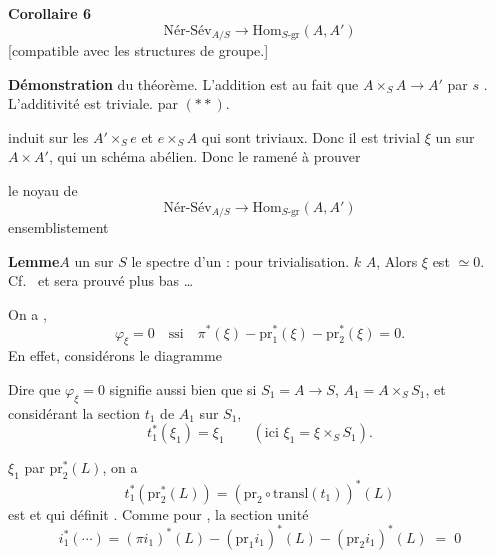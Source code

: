 \documentclass[11pt,a4paper]{article}
\begin{document}
\textbf{Corollaire 6}\quad \ill{}
\[
  \text{Nér-Sév}_{A/S} \longrightarrow
  \mathrm{Hom}_{S\text{-gr}}(A, A')
\]
[compatible avec les structures de groupe.]

\textbf{Démonstration} \ill{} du théorème. L'addition \ill{} est \ill{} au fait
que \ill{} $A \times_{S} A \to A'$ \ill{} par $s$ \ill{}. L'additivité \ill{}
est \ill{} triviale. \ill{} par $(**)$.


\ill{} induit \ill{} sur les \ill{} $A' \times_{S} e$ et $e \times_{S} A$ qui
sont triviaux. Donc il est trivial \ill{} $\xi$ \ill{} un \ill{} sur
$A \times A'$, qui \ill{} un schéma abélien. Donc le \ill{} ramené à prouver
\ill{}


\ill{} le noyau de
\[
  \text{Nér-Sév}_{A/S} \longrightarrow
  \mathrm{Hom}_{S\text{-gr}}(A, A')
\]
\ill{} ensemblistement \ill{}

\textbf{Lemme}\quad $A$ un \ill{} sur \ill{} $S$ \ill{} le spectre d'un \ill{} :
\ill{} pour \ill{} trivialisation. \ill{} $k$  \ill{}
$A$, \ill{} Alors $\xi$ est \ill{} $\simeq 0$. Cf.\ \ill{} et sera prouvé plus
bas \ldots



On a \ill{}, \ill{}
\[
  \varphi_{\xi} = 0 \quad \text{ssi} \quad
  \pi^{*}(\xi) - \mathrm{pr}_{1}^{*}(\xi) - \mathrm{pr}_{2}^{*}(\xi) = 0 .
\]
En effet, considérons le diagramme


Dire que $\varphi_{\xi} = 0$ signifie aussi \ill{} bien \ill{} que si
$S_{1} = A \to S$, $A_{1} = A \times_{S} S_{1}$, et considérant la \ill{}
section $t_{1}$ de $A_{1}$ sur $S_{1}$,
\[
  t_{1}^{*}(\xi_{1}) = \xi_{1} \qquad (\text{ici } \xi_{1} = \xi \times_{S} S_{1}) .
\]


\ill{} $\xi_{1}$ par $\mathrm{pr}_{2}^{*}(L)$, on a
\[
  t_{1}^{*}\!\left(\mathrm{pr}_{2}^{*}(L)\right) =
  \left(\mathrm{pr}_{2} \circ \mathrm{transl}(t_{1})\right)^{*}(L)
\]
\ill{} est \ill{} \ill{} et qui \ill{} \ill{} définit \ill{} \ill{}. Comme
\ill{} pour \ill{} \ill{}, \ill{} la section unité \ill{}
\[
  i_{1}^{*}(\cdots) = (\pi i_{1})^{*}(L) - (\mathrm{pr}_{1} i_{1})^{*}(L)
  - (\mathrm{pr}_{2} i_{1})^{*}(L) \;=\; 0
\]
\end{document}
